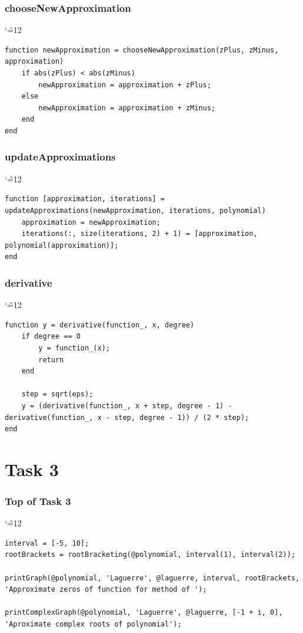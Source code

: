 \documentclass[12pt]{report}
\newenvironment{simplechar}{%
   \catcode`\^=12
}{}
\begin{document}
\subsubsection{chooseNewApproximation}
\begin{simplechar}
\begin{lstlisting}
function newApproximation = chooseNewApproximation(zPlus, zMinus, approximation)
    if abs(zPlus) < abs(zMinus)
        newApproximation = approximation + zPlus;
    else
        newApproximation = approximation + zMinus;
    end
end
\end{lstlisting}
\end{simplechar}

\subsubsection{updateApproximations}
\begin{simplechar}
\begin{lstlisting}
function [approximation, iterations] = updateApproximations(newApproximation, iterations, polynomial)
    approximation = newApproximation;
    iterations(:, size(iterations, 2) + 1) = [approximation, polynomial(approximation)];
end
\end{lstlisting}
\end{simplechar}

\subsubsection{derivative}
\begin{simplechar}
\begin{lstlisting}
function y = derivative(function_, x, degree)
    if degree == 0
        y = function_(x);
        return
    end

    step = sqrt(eps);
    y = (derivative(function_, x + step, degree - 1) - derivative(function_, x - step, degree - 1)) / (2 * step);
end
\end{lstlisting}
\end{simplechar}

\section{Task 3}

\subsubsection{Top of Task 3}
\begin{simplechar}
\begin{lstlisting}
interval = [-5, 10];
rootBrackets = rootBracketing(@polynomial, interval(1), interval(2));

printGraph(@polynomial, 'Laguerre', @laguerre, interval, rootBrackets, 'Approximate zeros of function for method of ');

printComplexGraph(@polynomial, 'Laguerre', @laguerre, [-1 + i, 0], 'Aproximate complex roots of polynomial');
\end{lstlisting}
\end{simplechar}
\end{document}
